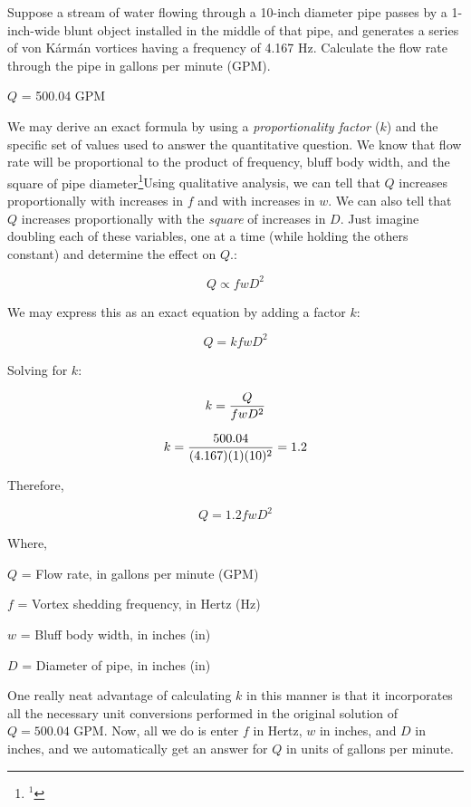 

Suppose a stream of water flowing through a 10-inch diameter pipe passes by a 1-inch-wide blunt object installed in the middle of that pipe, and generates a series of von K\'arm\'an vortices having a frequency of 4.167 Hz.  Calculate the flow rate through the pipe in gallons per minute (GPM). 







$Q$ = 500.04 GPM

\vskip 10pt

We may derive an exact formula by using a {\it proportionality factor} ($k$) and the specific set of values used to answer the quantitative question.  We know that flow rate will be proportional to the product of frequency, bluff body width, and the square of pipe diameter\footnote{$^{1}$}{Using qualitative analysis, we can tell that $Q$ increases proportionally with increases in $f$ and with increases in $w$.  We can also tell that $Q$ increases proportionally with the {\it square} of increases in $D$.  Just imagine doubling each of these variables, one at a time (while holding the others constant) and determine the effect on $Q$.}:

$$Q \propto f w D^2$$

We may express this as an exact equation by adding a factor $k$:

$$Q = k f w D^2$$

Solving for $k$:

$$k = {Q \over {f w D^2}}$$

$$k = {500.04 \over {(4.167)(1)(10)^2}} = 1.2$$

Therefore,

$$Q = 1.2 f w D^2$$

\noindent
Where,

$Q$ = Flow rate, in gallons per minute (GPM)

$f$ = Vortex shedding frequency, in Hertz (Hz)

$w$ = Bluff body width, in inches (in)

$D$ = Diameter of pipe, in inches (in)

\vskip 10pt

One really neat advantage of calculating $k$ in this manner is that it incorporates all the necessary unit conversions performed in the original solution of $Q = 500.04$ GPM.  Now, all we do is enter $f$ in Hertz, $w$ in inches, and $D$ in inches, and we automatically get an answer for $Q$ in units of gallons per minute.












